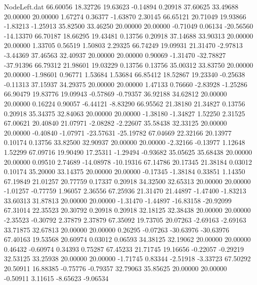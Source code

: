 \begin{filecontents}{NodeLeft.dat}
  66.60056   18.32726   19.63623    -0.14894    0.20918   37.60625   33.49688   20.00000   20.00000    1.67274    0.36377   -1.63870    2.30145
  66.65121   20.71049   19.93866    -1.83213   -1.25913   35.82500   33.46250   20.00000   20.00000   -0.71049    0.06134  -20.56560  -14.13370
  66.70187   18.66295   19.43481     0.13756    0.20918   37.14688   33.90313   20.00000   20.00000    1.33705    0.56519    1.50803    2.29325
  66.74249   19.09931   21.31470    -2.97813   -3.44369   37.46563   32.40937   20.00000   20.00000    0.90069   -1.31470  -32.78827  -37.91396
  66.79312   21.98601   19.03229     0.13756    0.13756   35.00312   33.83750   20.00000   20.00000   -1.98601    0.96771    1.53684    1.53684
  66.85412   18.52867   19.23340    -0.25638   -0.11313   37.15937   34.29375   20.00000   20.00000    1.47133    0.76660   -2.83928   -1.25286
  66.90479   19.83776   19.09943    -0.57869   -0.79357   36.92188   34.62812   20.00000   20.00000    0.16224    0.90057   -6.44121   -8.83290
  66.95562   21.38180   21.34827     0.13756    0.20918   35.34375   32.84063   20.00000   20.00000   -1.38180   -1.34827    1.52250    2.31525
  67.00621   20.40840   21.07971    -2.08282   -2.22607   35.58438   32.33125   20.00000   20.00000   -0.40840   -1.07971  -23.57631  -25.19782
  67.04669   22.32166   20.13977     0.10174    0.13756   33.82500   32.90937   20.00000   20.00000   -2.32166   -0.13977    1.12648    1.52299
  67.09716   19.90490   17.25311    -1.29494   -0.93682   35.05625   35.68438   20.00000   20.00000    0.09510    2.74689  -14.08978  -10.19316
  67.14786   20.17345   21.38184     0.03012    0.10174   35.20000   33.14375   20.00000   20.00000   -0.17345   -1.38184    0.33851    1.14350
  67.19849   21.01257   20.77759     0.17337    0.20918   34.32500   32.65313   20.00000   20.00000   -1.01257   -0.77759    1.96057    2.36556
  67.25936   21.31470   21.44897    -1.47400   -1.83213   33.60313   31.87813   20.00000   20.00000   -1.31470   -1.44897  -16.83158  -20.92099
  67.31014   22.35523   20.30792     0.20918    0.20918   32.18125   32.38438   20.00000   20.00000   -2.35523   -0.30792    2.37879    2.37879
  67.35092   19.73705   20.07263    -2.69163   -2.69163   33.71875   32.67813   20.00000   20.00000    0.26295   -0.07263  -30.63976  -30.63976
  67.40163   19.53568   20.60974     0.03012    0.06593   34.38125   32.19062   20.00000   20.00000    0.46432   -0.60974    0.34393    0.75287
  67.45233   21.71745   19.16656    -0.22057   -0.29219   32.53125   33.25938   20.00000   20.00000   -1.71745    0.83344   -2.51918   -3.33723
  67.50292   20.50911   16.88385    -0.75776   -0.79357   32.79063   35.85625   20.00000   20.00000   -0.50911    3.11615   -8.65623   -9.06534

\end{filecontents}
